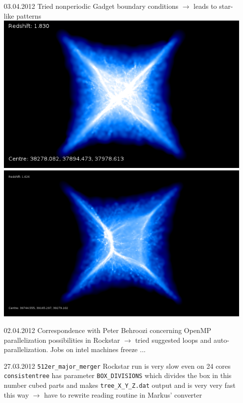 \begin{itemize}
\item[03.04.2012]
Tried nonperiodic Gadget boundary conditions $\rightarrow$ leads 
to star-like patterns \\
\includegraphics[scale=0.3]{r256/h100/nonperiodictest/drd5nonperiodic.png}
\includegraphics[scale=0.2]{r256/h100/nonperiodictest/stages20nonperiodic.png} \\


\item[02.04.2012]
Correspondence with Peter Behroozi concerning OpenMP parallelization
possibilities in Rockstar  $\rightarrow$ tried suggested loops 
and auto-parallelization. Jobs on intel machines freeze ... 

\item[27.03.2012] 
\texttt{512er\_major\_merger} Rockstar run is very slow even 
on 24 cores \\
\texttt{consistentree} has parameter \texttt{BOX\_DIVISIONS} which divides 
the box in this number cubed parts and makes \texttt{tree\_X\_Y\_Z.dat} 
output and is very very fast this way 
$\rightarrow$ have to rewrite reading routine in Markus' 
converter \\


\end{itemize}
